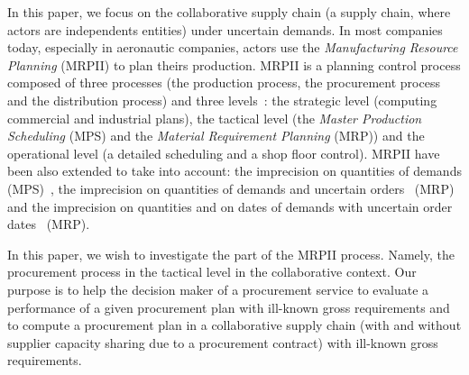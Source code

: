 \documentclass[11pt]{article}
\begin{document}
In this paper, we focus on the collaborative supply chain (a supply chain,
 where actors are independents entities) 
 under uncertain demands. 
  In most companies today, especially in
aeronautic companies,  actors use the 
\emph{Manufacturing Resource Planning} (MRPII) to plan theirs production. 
MRPII is a
planning control process composed of three processes (the production process, 
the procurement process and the distribution process)
and three levels~\cite{ACC11}: the strategic level (computing   commercial
and industrial plans), the tactical level (the \emph{Master Production Scheduling}
 (MPS) and the \emph{Material
Requirement Planning} (MRP)) and the operational level (a detailed scheduling and 
a shop floor control). 
MRPII have been also  extended  to take into account:
the imprecision on  quantities   of
demands (MPS)~\cite{HT00}, 
the imprecision on quantities  of   demands and uncertain orders~\cite{GLRV05} (MRP)
and the imprecision on 
 quantities and on dates of demands with uncertain order dates~\cite{GTG10} (MRP).

 In this paper, we wish to investigate the part of
the MRPII process. Namely, 
 the procurement process in the tactical level in the collaborative context. 
 Our purpose is 
 to help the decision maker of a procurement service to
evaluate a performance of a given procurement plan with ill-known gross requirements
 and to
compute a procurement plan in a collaborative supply chain (with and without
supplier capacity sharing due to a procurement contract)  with ill-known gross requirements.
\end{document}
